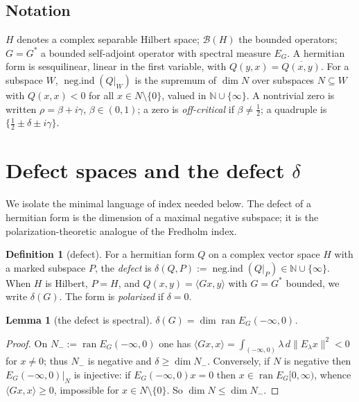 \documentclass[11pt,reqno]{amsart}
\newtheorem{lemma}[theorem]{Lemma}
\theoremstyle{definition}
\newtheorem{definition}[theorem]{Definition}
\newcommand{\negind}{\operatorname{neg.ind}}
\newcommand{\ran}{\operatorname{ran}}
\newcommand{\N}{\mathbb{N}}
\newcommand{\half}{\tfrac12}
\begin{document}
\subsection*{Notation}
\(H\) denotes a complex separable Hilbert space; \(\mathcal B(H)\) the bounded
operators; \(G=G^*\) a bounded self-adjoint operator with spectral measure
\(E_G\). A hermitian form is sesquilinear, linear in the first variable, with
\(Q(y,x)=\overline{Q(x,y)}\). For a subspace \(W\), \(\negind(Q|_W)\) is the
supremum of \(\dim N\) over subspaces \(N\subseteq W\) with \(Q(x,x)<0\) for all
\(x\in N\setminus\{0\}\), valued in \(\N\cup\{\infty\}\). A nontrivial zero is
written \(\rho=\beta+i\gamma\), \(\beta\in(0,1)\); a zero is \emph{off-critical}
if \(\beta\neq\half\); a quadruple is \(\{\half\pm\delta\pm i\gamma\}\).

\section{Defect spaces and the defect \texorpdfstring{$\delta$}{delta}}
\label{sec:defect}

We isolate the minimal language of index needed below. The defect of a hermitian
form is the dimension of a maximal negative subspace; it is the
polarization-theoretic analogue of the Fredholm index.

\begin{definition}[defect]\label{def:defect}
For a hermitian form \(Q\) on a complex vector space \(H\) with a marked
subspace \(P\), the \emph{defect} is
\(\delta(Q,P):=\negind(Q|_P)\in\N\cup\{\infty\}\). When \(H\) is Hilbert,
\(P=H\), and \(Q(x,y)=\langle Gx,y\rangle\) with \(G=G^*\) bounded, we write
\(\delta(G)\). The form is \emph{polarized} if \(\delta=0\).
\end{definition}

\begin{lemma}[the defect is spectral]\label{lem:defect-spectral}
\(\delta(G)=\dim\ran E_G(-\infty,0)\).
\end{lemma}

\begin{proof}
On \(N_-:=\ran E_G(-\infty,0)\) one has
\(\langle Gx,x\rangle=\int_{(-\infty,0)}\lambda\,d\|E_\lambda x\|^2<0\) for
\(x\neq0\); thus \(N_-\) is negative and \(\delta\geq\dim N_-\). Conversely, if
\(N\) is negative then \(E_G(-\infty,0)|_N\) is injective: if
\(E_G(-\infty,0)x=0\) then \(x\in\ran E_G[0,\infty)\), whence
\(\langle Gx,x\rangle\geq0\), impossible for \(x\in N\setminus\{0\}\). So
\(\dim N\leq\dim N_-\).
\end{proof}
\end{document}
